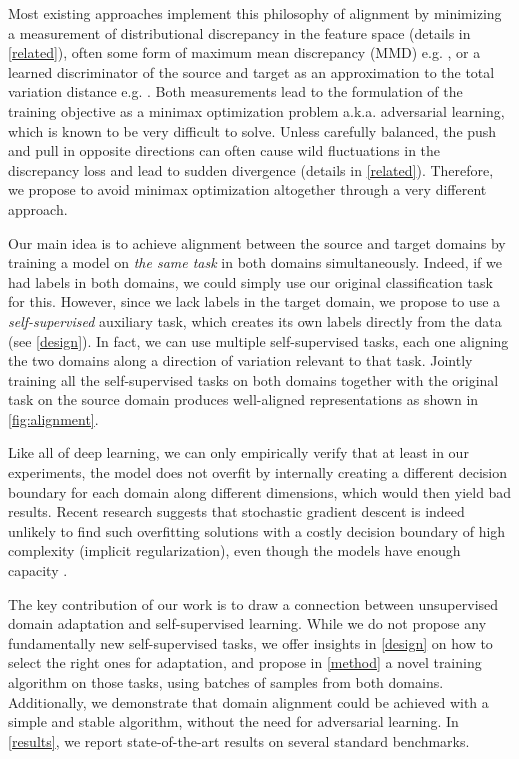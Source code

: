 \documentclass{article} \usepackage{iclr2020_conference,times}
\begin{document}
Most existing approaches implement this philosophy of alignment by minimizing a measurement of distributional discrepancy in the feature space (details in \autoref{related}), often some form of maximum mean discrepancy (MMD) e.g. \cite{long2017deep}, or a learned discriminator of the source and target as an approximation to the total variation distance e.g. \cite{ganin2016domain}. Both measurements lead to the formulation of the training objective as a minimax optimization problem a.k.a. adversarial learning, which is known to be very difficult to solve.
Unless carefully balanced,
the push and pull in opposite directions can often cause wild fluctuations in the discrepancy loss and lead to sudden divergence (details in \autoref{related}).
Therefore, we propose to avoid minimax optimization altogether through a very different approach.

Our main idea is to achieve alignment between the source and target domains by training a model on {\em the same task} in both domains simultaneously. 
Indeed, if we had labels in both domains, we could simply use our original classification task for this.    However, since we lack labels in the target domain, we propose to use a {\em self-supervised} auxiliary task, which creates its own labels directly from the data (see \autoref{design}).  
In fact, we can use multiple self-supervised tasks, each one aligning the two domains along a direction of variation relevant to that task.   Jointly training all the self-supervised tasks on both domains together with the original task on the source domain produces well-aligned representations as shown in \autoref{fig:alignment}.

Like all of deep learning, we can only empirically verify that at least in our experiments, the model does not overfit by internally creating a different decision boundary for each domain along different dimensions, which would then yield bad results.  Recent research suggests that stochastic gradient descent is indeed unlikely to find such overfitting solutions with a costly decision boundary of high complexity (implicit regularization), even though the models have enough capacity \citep{zhang2016understanding, neyshabur2017geometry, arora2018stronger}.



The key contribution of our work is to draw a connection between unsupervised domain adaptation and self-supervised learning. 
While we do not propose any fundamentally new self-supervised tasks, 
we offer insights in \autoref{design} on how to select the right ones for adaptation, and propose in \autoref{method} a novel training algorithm on those tasks, using batches of samples from both domains. 
Additionally, we demonstrate that domain alignment could be achieved with a simple and stable algorithm, without the need for adversarial learning.  In \autoref{results}, we report state-of-the-art results on several standard benchmarks. 
\end{document}
